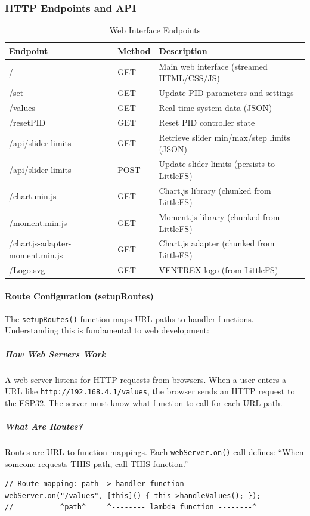 \documentclass[12pt,a4paper]{article}
\begin{document}
\subsubsection{HTTP Endpoints and API}

\begin{table}[H]
\centering
\begin{tabular}{@{}lll@{}}
\toprule
\textbf{Endpoint} & \textbf{Method} & \textbf{Description} \\
\midrule
/ & GET & Main web interface (streamed HTML/CSS/JS) \\
/set & GET & Update PID parameters and settings \\
/values & GET & Real-time system data (JSON) \\
/resetPID & GET & Reset PID controller state \\
/api/slider-limits & GET & Retrieve slider min/max/step limits (JSON) \\
/api/slider-limits & POST & Update slider limits (persists to LittleFS) \\
/chart.min.js & GET & Chart.js library (chunked from LittleFS) \\
/moment.min.js & GET & Moment.js library (chunked from LittleFS) \\
/chartjs-adapter-moment.min.js & GET & Chart.js adapter (chunked from LittleFS) \\
/Logo.svg & GET & VENTREX logo (from LittleFS) \\
\bottomrule
\end{tabular}
\caption{Web Interface Endpoints}
\end{table}

\paragraph{Route Configuration (setupRoutes)}
The \texttt{setupRoutes()} function maps URL paths to handler functions. Understanding this is fundamental to web development:

\subparagraph{How Web Servers Work}
A web server listens for HTTP requests from browsers. When a user enters a URL like \texttt{http://192.168.4.1/values}, the browser sends an HTTP request to the ESP32. The server must know what function to call for each URL path.

\subparagraph{What Are Routes?}
Routes are URL-to-function mappings. Each \texttt{webServer.on()} call defines: ``When someone requests THIS path, call THIS function.''

\begin{lstlisting}[caption=Route Registration Example]
// Route mapping: path -> handler function
webServer.on("/values", [this]() { this->handleValues(); });
//           ^path^     ^-------- lambda function --------^
\end{lstlisting}
\end{document}
